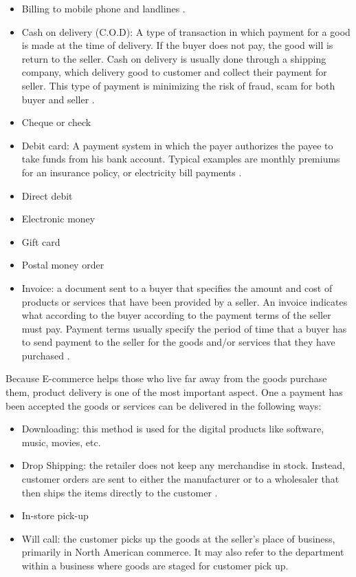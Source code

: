 \documentclass[conference]{IEEEtran}
\begin{document}
\begin{itemize}
 \item Billing to mobile phone and landlines \cite{HowtoRunDropShip}.
  \item Cash on delivery (C.O.D): A type of transaction in which payment for a good is made at the time of delivery. If the buyer does not pay, the good will is return to the seller. Cash on delivery is usually done through a shipping company, which delivery good to customer and collect their payment for seller. This type of payment is minimizing the risk of fraud, scam for both buyer and seller \cite{cod2015}.
  \item Cheque or check
  \item Debit card: A payment system in which the payer authorizes the payee to take funds from his bank account. Typical examples are monthly premiums for an insurance policy, or electricity bill payments \cite{directdebit2015}.
  \item Direct debit
  \item Electronic money
  \item Gift card
  \item Postal money order
  \item Invoice: a document sent to a buyer that specifies the amount and cost of products or services that have been provided by a seller. An invoice indicates what according to the buyer according to the payment terms of the seller must pay. Payment terms usually specify the period of time that a buyer has to send payment to the seller for the goods and/or services that they have purchased \cite{invoice2015}.
\end{itemize}

Because E-commerce helps those who live far away from the goods purchase them, product delivery is one of the most important aspect. One a payment has been accepted the goods or services can be delivered in the following ways:

\begin{itemize}
\item Downloading: this method is used for the digital products like software, music, movies, etc.
\item Drop Shipping: the retailer does not keep any merchandise in stock. Instead, customer orders are sent to either the manufacturer or to a wholesaler that then ships the items directly to the customer
\cite{HowtoRunDropShip}.
\item In-store pick-up 
\item Will call: the customer picks up the goods at the seller's place of business, primarily in North American commerce. It may also refer to the department within a business where goods are staged for customer pick up.
\end{itemize}
\end{document}
